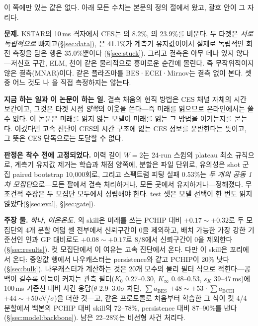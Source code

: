 \documentclass[10pt,a4paper]{article}
\begin{document}
이 쪽에만 있는 값은 없다. 아래 모든 수치는 본문의 정의 절에서 왔고, 괄호 안이 그
자리다.

\textbf{문제.} KSTAR의 10\,ms 격자에서 CES는 \Ti{}의 8.2\%, \Vrot{}의 23.9\%를
비운다. 두 타겟은 \emph{서로 독립적으로} 빠지고(\S\ref{sec:data}), \Vrot{}은
41.1\%가 계측기 유지값이어서 실제로 독립적인 회전 측정을 담은 행은 35.0\%뿐이다
(\S\ref{sec:stuck}). 그리고 결측은 아무 데나 있지 않다---저신호 구간, ELM, 천이
같은 물리적으로 흥미로운 순간에 몰린다. 즉 무작위적이지 않은 결측(MNAR)이다.
같은 플라즈마를 BES·ECEI·Mirnov는 결측 없이 본다. 셋 중 어느 것도 \Ti{}나
\Vrot{}을 직접 측정하지는 않는다.

\textbf{지금 하는 일과 이 논문이 하는 일.} 결측 채움의 현직 방법은 CES 채널 자체의
시간 보간이고, 그것은 타겟 시점 \emph{양쪽}의 이웃을 쓴다---즉 미래를 읽으므로
온라인에서는 쓸 수 없다. 이 논문은 미래를 읽지 않는 모델이 미래를 읽는 그 방법을
이기는지를 묻는다. 이겼다면 고속 진단이 CES의 시간 구조에 없는 CES 정보를
운반한다는 뜻이고, 그 뜻은 CES 단독으로는 도달할 수 없다.

\textbf{판정은 착수 전에 고정되었다.} 이력 길이 $W{=}2$는 24-run 스윕의 plateau
최소 규칙으로, 계측기 유지값 제거는 학습과 채점 양쪽에, 분할은 파일 단위로,
유의성은 shot 군집 paired bootstrap 10{,}000회로, 그리고 \Ti{} 스펙트럼 피팅
실패 0.53\%는 \emph{두 개의 공동 1차 모집단}으로---모든 팔에서 결측 처리하거나,
모든 곳에서 유지하거나---정해졌다. 무조건적 주장은 두 모집단 모두에서 성립해야
한다. test 셋은 모델 선택이 한 번도 읽지 않았다(\S\ref{sec:eval},
\S\ref{sec:gate}).

\textbf{주장 둘.} \emph{하나, 이온온도.} \Ti{}의 skill은 미래를 쓰는 PCHIP 대비
$+0.17\sim+0.32$로 두 모집단의 4개 분할 여덟 셀 전부에서 신뢰구간이 0을 제외하고,
배치 가능한 가장 강한 기준선인 인과 GP 대비로도 $+0.08\sim+0.17$로 8/8에서
신뢰구간이 0을 제외한다(\S\ref{sec:results}). 컷 모집단에서 이 여유는 고속 진단에서
온다. 다만 이 skill은 꼬리에서 온다: 중앙값 행에서 나우캐스터는 persistence와 같고
PCHIP이 20\% 낫다(\S\ref{sec:bulk}). 나우캐스터가
계산하는 것은 20개 모수의 물리 필터 식으로 적힌다---공백이 길수록 이득이 커지는 관측
필터($K_0$ 0.27--0.30, $K_\infty$ 0.48--0.53, $s_K$ 39--47\,ms)에 100\,ms 기준선 대비
사건 응답($\theta$ 2.9--3.0$\sigma$ 차단, $\sum a_{\mathrm{BES}}$ $+48\sim+53$·$\sum
a_{\mathrm{ECEI}}$ $+44\sim+50$\,eV/$\sigma$)을 더한 것---고, 같은 프로토콜로 처음부터
학습한 그 식이 컷 4/4 분할에서 백본의 PCHIP 대비 skill의 72--78\%, persistence 대비
87--90\%를 낸다(\S\ref{sec:model:backbone}). 남은 22--28\%는 비선형 사건 처리다.
\end{document}
